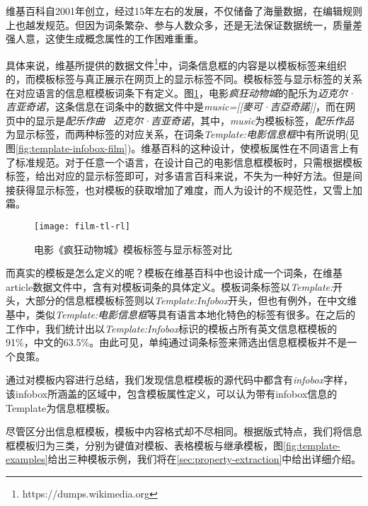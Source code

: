 维基百科自2001年创立，经过15年左右的发展，不仅储备了海量数据，在编辑规则上也越发规范。但因为词条繁杂、参与人数众多，还是无法保证数据统一，质量差强人意，这使生成概念属性的工作困难重重。

具体来说，维基所提供的数据文件\footnote{https://dumps.wikimedia.org}中，词条信息框的内容是以{\heiti 模板标签}来组织的，而模板标签与真正展示在网页上的{\heiti 显示标签}不同。模板标签与显示标签的关系在对应语言的信息框模板词条下有定义。图\ref{fig:film-tl-rl}，电影\textit{疯狂动物城}的配乐为\textit{迈克尔·吉亚奇诺}，这条信息在词条中的数据文件中是\textit{music=[[麥可·吉亞奇諾]]}，而在网页中的显示是\textit{配乐作曲 \ 迈克尔·吉亚奇诺}，其中，\textit{music}为模板标签，\textit{配乐作品}为显示标签，而两种标签的对应关系，在词条\textit{Template:电影信息框}中有所说明(见图\ref{fig:template-infobox-film})。维基百科的这种设计，使模板属性在不同语言上有了标准规范。对于任意一个语言，在设计自己的电影信息框模板时，只需根据模板标签，给出对应的显示标签即可，对多语言百科来说，不失为一种好方法。但是间接获得显示标签，也对模板的获取增加了难度，而人为设计的不规范性，又雪上加霜。

\begin{figure}[H]
  \centering
  \texttt{[image: film-tl-rl]}
  \caption{电影《疯狂动物城》模板标签与显示标签对比}
  \label{fig:film-tl-rl}
\end{figure}

而真实的模板是怎么定义的呢？模板在维基百科中也设计成一个词条，在维基article数据文件中，含有对模板词条的具体定义。模板词条标签以\textit{Template:}开头，大部分的信息框模板标签则以\textit{Template:Infobox}开头，但也有例外，在中文维基中，类似\textit{Template:电影信息框}等具有语言本地化特色的标签有很多。在之后的工作中，我们统计出以\textit{Template:Infobox}标识的模板占所有英文信息框模板的91\%，中文的63.5\%。由此可见，单纯通过词条标签来筛选出信息框模板并不是一个良策。

通过对模板内容进行总结，我们发现信息框模板的源代码中都含有\textit{infobox}字样，该infobox所涵盖的区域中，包含模板属性定义，可以认为带有infobox信息的Template为信息框模板。

尽管区分出信息框模板，模板中内容格式却不尽相同。根据版式特点，我们将信息框模板归为三类，分别为键值对模板、表格模板与继承模板，图\ref{fig:template-examples}给出三种模板示例，我们将在\ref{sec:property-extraction}中给出详细介绍。

